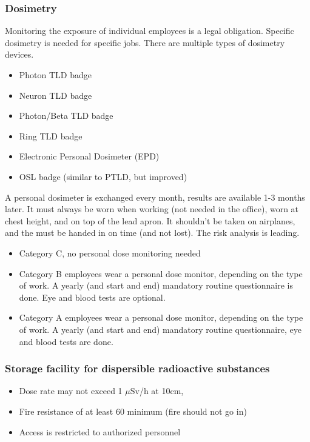 \subsubsection{Dosimetry}
Monitoring the exposure of individual employees is a legal obligation. Specific dosimetry is needed for specific jobs. There are multiple types of dosimetry devices.
\begin{itemize}
	\item Photon TLD badge
	\item Neuron TLD badge
	\item Photon/Beta TLD badge
	\item Ring TLD badge
	\item Electronic Personal Dosimeter (EPD)
	\item OSL badge (similar to PTLD, but improved)
\end{itemize}
A personal dosimeter is exchanged every month, results are available 1-3 months later. It must always be worn when working (not needed in the office), worn at chest height, and on top of the lead apron. It shouldn't be taken on airplanes, and the must be handed in on time (and not lost). The risk analysis is leading.
\begin{itemize}
	\item Category C, no personal dose monitoring needed
	\item Category B employees wear a personal dose monitor, depending on the type of work. A yearly (and start and end) mandatory routine questionnaire is done. Eye and blood tests are optional.
	\item Category A employees wear a personal dose monitor, depending on the type of work. A yearly (and start and end) mandatory routine questionnaire, eye and blood tests are done. 
\end{itemize}

\subsubsection{Storage facility for dispersible radioactive substances}
\begin{itemize}
	\item Dose rate may not exceed 1 $\mu$Sv/h at 10cm,
	\item Fire resistance of at least 60 minimum (fire should not go in)
	\item Access is restricted to authorized personnel
\end{itemize}


